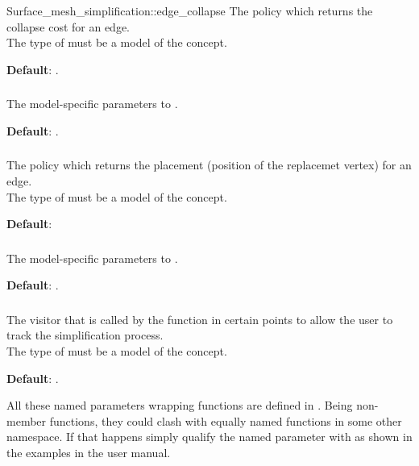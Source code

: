 \begin{ccRefFunction}{Surface_mesh_simplification::edge_collapse}
The policy which returns the collapse cost for an edge.\\
The type of  must be a model of the  concept.

\textbf{Default}: 
.

\subsubsection{}

The model-specific parameters to .

\textbf{Default}: .

\subsubsection{}

The policy which returns the placement (position of the replacemet vertex)
for an edge.\\
The type of  must be a model of the  concept.

\textbf{Default}: 

\subsubsection{}

The model-specific parameters to .

\textbf{Default}: .

\subsubsection{}

The visitor that is called by the  function
in certain points to allow the user to track the simplification process.\\
The type of  must be a model of the  concept.

\textbf{Default}: .

All these named parameters wrapping functions are defined in . Being non-member functions, they could clash with equally named functions in some other namespace. If that happens simply qualify the named parameter with  as shown in the examples in the user manual.


\end{ccRefFunction}
